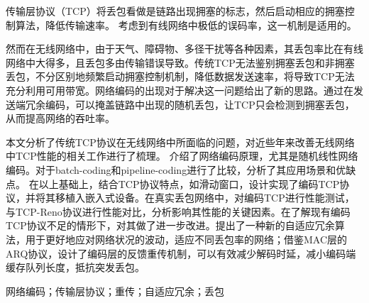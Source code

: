 \cabstract
{
	\par
	传输层协议（TCP）将丢包看做是链路出现拥塞的标志，然后启动相应的拥塞控制算法，降低传输速率。
	考虑到有线网络中极低的误码率，这一机制是适用的。
	\par
	然而在无线网络中，由于天气、障碍物、多径干扰等各种因素，其丢包率比在有线网络中大得多，且丢包多由传输错误导致。传统TCP无法鉴别拥塞丢包和非拥塞丢包，不分区别地频繁启动拥塞控制机制，降低数据发送速率，将导致TCP无法充分利用可用带宽。网络编码的出现对于解决这一问题给出了新的思路。通过在发送端冗余编码，可以掩盖链路中出现的随机丢包，让TCP只会检测到拥塞丢包，从而提高网络的吞吐率。
	\par
	本文分析了传统TCP协议在无线网络中所面临的问题，对近些年来改善无线网络中TCP性能的相关工作进行了梳理。
	介绍了网络编码原理，尤其是随机线性网络编码。对于batch-coding和pipeline-coding进行了比较，分析了其应用场景和优缺点。
	在以上基础上，结合TCP协议特点，如滑动窗口，设计实现了编码TCP协议，并将其移植入嵌入式设备。在真实丢包网络中，对编码TCP进行性能测试，与TCP-Reno协议进行性能对比，分析影响其性能的关键因素。在了解现有编码TCP协议不足的情形下，对其做了进一步改进。提出了一种新的自适应冗余算法，用于更好地应对网络状况的波动，适应不同丢包率的网络；借鉴MAC层的ARQ协议，设计了编码层的反馈重传机制，可以有效减少解码时延，减小编码端缓存队列长度，抵抗突发丢包。
	\par
	
}
{网络编码；传输层协议；重传；自适应冗余；丢包} 	%